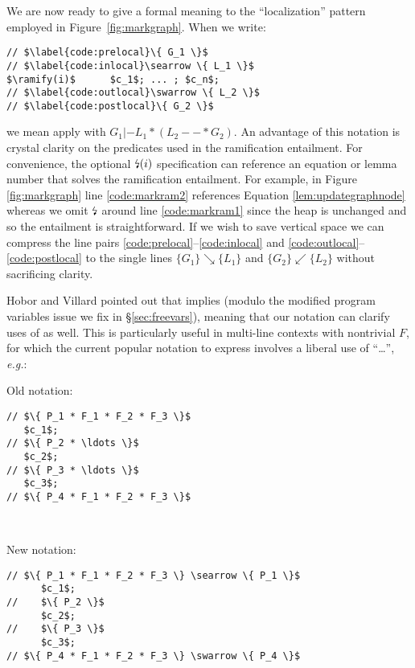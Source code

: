 We are now ready to give a formal meaning to the ``localization'' pattern employed in Figure~\ref{fig:markgraph}.  When we write:
\begin{lstlisting}
// $\label{code:prelocal}\{ G_1 \}$
// $\label{code:inlocal}\searrow \{ L_1 \}$
$\ramify(i)$      $c_1$; ... ; $c_n$;
// $\label{code:outlocal}\swarrow \{ L_2 \}$
// $\label{code:postlocal}\{ G_2 \}$
\end{lstlisting}
we mean apply  with $G_1 |- L_1 * (L_2 --* G_2)$.
An advantage of this notation is crystal clarity on the predicates used in the ramification entailment.  For convenience, the optional $\mbox{\lightning}(i)$ specification can reference an equation or lemma number that solves the ramification entailment.  For example, in Figure \ref{fig:markgraph} line \ref{code:markram2} references Equation \eqref{lem:updategraphnode} whereas we omit $\mbox{\lightning}$ around line \ref{code:markram1} since the heap is unchanged and so the entailment is straightforward. If we wish to save vertical space we can compress the line pairs \ref{code:prelocal}--\ref{code:inlocal} and \ref{code:outlocal}--\ref{code:postlocal}
to the single lines $\{ G_1 \} \searrow \{ L_1 \}$ and $\{ G_2 \} \swarrow \{ L_2 \}$ without sacrificing clarity.

Hobor and Villard pointed out that  implies  (modulo the modified program variables issue we fix in \S\ref{sec:freevars}), meaning that our notation can clarify uses of  as well.  This is particularly useful in multi-line contexts with nontrivial $F$, for which the current popular notation to express  involves a liberal use of ``\ldots'', \emph{e.g.}:

\vspace{5pt}

\begin{minipage}{.19\textwidth}
Old notation:
\begin{lstlisting}
// $\{ P_1 * F_1 * F_2 * F_3 \}$
   $c_1$;
// $\{ P_2 * \ldots \}$
   $c_2$;
// $\{ P_3 * \ldots \}$
   $c_3$;
// $\{ P_4 * F_1 * F_2 * F_3 \}$
\end{lstlisting}
\end{minipage} \vline ~~~
\begin{minipage}{.2\textwidth}
New notation:
\begin{lstlisting}[numbers=none]
// $\{ P_1 * F_1 * F_2 * F_3 \} \searrow \{ P_1 \}$
      $c_1$;
//    $\{ P_2 \}$
      $c_2$;
//    $\{ P_3 \}$
      $c_3$;
// $\{ P_4 * F_1 * F_2 * F_3 \} \swarrow \{ P_4 \}$
\end{lstlisting}
\end{minipage}

